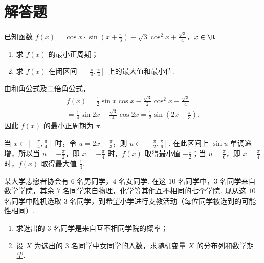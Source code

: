 \section{解答题}

\begin{problem}
已知函数 \(f(x) = \cos x \cdot \sin\left(x + \frac{\pi}{3}\right) - \sqrt{3}\cos^2 x + \frac{\sqrt{3}}{4}\)，\(x \in \R\).

\begin{enumerate}
\item 求 \(f(x)\) 的最小正周期；
\item 求 \( f(x) \) 在闭区间 \(\left[-\frac{\pi}{4}, \frac{\pi}{4}\right]\) 上的最大值和最小值.
\end{enumerate}
\end{problem}

\begin{solution}
由和角公式及二倍角公式，
\[
\begin{gathered}
f(x)=\frac12\sin x\cos x-\frac{\sqrt3}{2}\cos^2x+\frac{\sqrt3}{4}\\
=\frac14\sin2x-\frac{\sqrt3}{4}\cos2x
=\frac12\sin\left(2x-\frac{\pi}{3}\right).
\end{gathered}
\]
因此 \(f(x)\) 的最小正周期为 \(\pi\).

当 \(x\in\left[-\frac{\pi}{4},\frac{\pi}{4}\right]\) 时，令 \(u=2x-\frac{\pi}{3}\)，则 \(u\in\left[-\frac{\pi}{2},\frac{\pi}{6}\right]\). 在此区间上 \(\sin u\) 单调递增，所以当 \(u=-\frac{\pi}{2}\)，即 \(x=-\frac{\pi}{4}\) 时，\(f(x)\) 取得最小值 \(-\frac12\)；当 \(u=\frac{\pi}{6}\)，即 \(x=\frac{\pi}{4}\) 时，\(f(x)\) 取得最大值 \(\frac14\).
\end{solution}

\begin{problem}
某大学志愿者协会有 \(6\) 名男同学，\(4\) 名女同学. 在这 \(10\) 名同学中，\(3\) 名同学来自数学学院，其余 \(7\) 名同学来自物理，化学等其他互不相同的七个学院. 现从这 \(10\) 名同学中随机选取 \(3\) 名同学，到希望小学进行支教活动（每位同学被选到的可能性相同）.

\begin{enumerate}
\item 求选出的 \(3\) 名同学是来自互不相同学院的概率；
\item 设 \(X\) 为选出的 \(3\) 名同学中女同学的人数，求随机变量 \(X\) 的分布列和数学期望.
\end{enumerate}
\end{problem}

